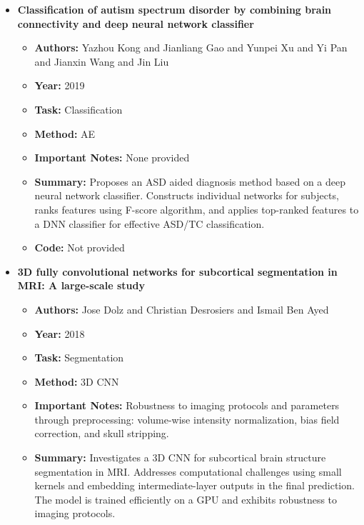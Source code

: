 \documentclass{article}
\begin{document}
\begin{itemize}[left=0pt]
  \item \textbf{Classification of autism spectrum disorder by combining brain connectivity and deep neural network classifier}
  \begin{itemize}
    \item \textbf{Authors:} Yazhou Kong and Jianliang Gao and Yunpei Xu and Yi Pan and Jianxin Wang and Jin Liu
    \item \textbf{Year:} 2019
    \item \textbf{Task:} Classification
    \item \textbf{Method:} AE
    \item \textbf{Important Notes:} None provided
    \item \textbf{Summary:} Proposes an ASD aided diagnosis method based on a deep neural network classifier. Constructs individual networks for subjects, ranks features using F-score algorithm, and applies top-ranked features to a DNN classifier for effective ASD/TC classification.
    \item \textbf{Code:} Not provided
  \end{itemize}

  \item \textbf{3D fully convolutional networks for subcortical segmentation in MRI: A large-scale study}
  \begin{itemize}
    \item \textbf{Authors:} Jose Dolz and Christian Desrosiers and Ismail Ben Ayed
    \item \textbf{Year:} 2018
    \item \textbf{Task:} Segmentation
    \item \textbf{Method:} 3D CNN
    \item \textbf{Important Notes:} Robustness to imaging protocols and parameters through preprocessing: volume-wise intensity normalization, bias field correction, and skull stripping.
    \item \textbf{Summary:} Investigates a 3D CNN for subcortical brain structure segmentation in MRI. Addresses computational challenges using small kernels and embedding intermediate-layer outputs in the final prediction. The model is trained efficiently on a GPU and exhibits robustness to imaging protocols.
  \end{itemize}

\end{itemize}
\end{document}
